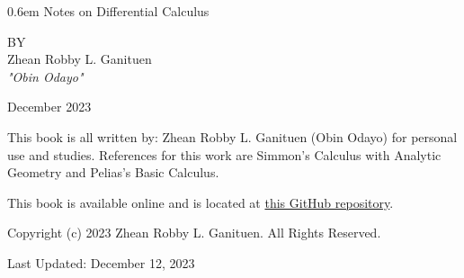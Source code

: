 \documentclass{report}
\newcommand\nbvspace[1][3]{\vspace*{\stretch{#1}}}
\newcommand{\nbtitlestretch}{\spaceskip0.6em}
\begin{document}
{\begin{center}    
    \thispagestyle{empty}
    \Huge
    {\nbtitlestretch\huge
    Notes on Differential Calculus}

    \nbvspace[1]
    \normalsize

    \nbvspace[1]
    \small BY\\
    \Large Zhean Robby L. Ganituen\\[0.5em]
    \tiny\emph{"Obin Odayo"}

    \nbvspace[2]
    \normalsize

    December
    2023
\end{center}}

\newpage

This book is all written by: Zhean Robby L. Ganituen (Obin Odayo) for personal use and studies. References for this work are Simmon's Calculus with Analytic Geometry and Pelias's Basic Calculus.

\bigskip

This book is available online and is located at \href{https://github.com/obin-odayo/Calculus-Notes}{this GitHub repository}. 

\bigskip

Copyright (c) 2023 Zhean Robby L. Ganituen. All Rights Reserved.

\bigskip

Last Updated: December 12, 2023

\tableofcontents


\end{document}
